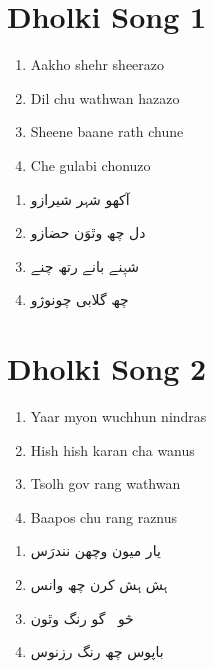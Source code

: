 \documentclass[12pt]{article}
\newcommand{\bigroman}[1]{\fontsize{16pt}{18pt}\selectfont\RaggedRight #1}
\newcommand{\bigarabic}[1]{\fontsize{16pt}{18pt}\selectfont\RaggedLeft \textarabic{#1}}
\begin{document}
\linenumbers

\section*{Dholki Song 1}

\begin{multicols}{2}

\begin{enumerate}[left=0pt,label=\arabic*.]
\item \bigroman{Aakho shehr sheerazo}
\item \bigroman{Dil chu wathwan hazazo}
\item \bigroman{Sheene baane rath chune}
\item \bigroman{Che gulabi chonuzo}
\end{enumerate}

\columnbreak

\begin{enumerate}[left=0pt,label=\arabic*.]
\item \bigarabic{آکھو شہر شیرازو}
\item \bigarabic{دل چھ وٿوَن حضازو}
\item \bigarabic{شیٖنے بانے رتھ چنے}
\item \bigarabic{چھ گلابی چونوژو}
\end{enumerate}

\end{multicols}

\vspace{1cm}

\section*{Dholki Song 2}

\begin{multicols}{2}

\begin{enumerate}[left=0pt,label=\arabic*.]
\item \bigroman{Yaar myon wuchhun nindras}
\item \bigroman{Hish hish karan cha wanus}
\item \bigroman{Tsolh gov rang wathwan}
\item \bigroman{Baapos chu rang raznus}
\end{enumerate}

\columnbreak

\begin{enumerate}[left=0pt,label=\arabic*.]
\item \bigarabic{یار میون وچھن نندرَس}
\item \bigarabic{ہش ہش کرن چھ وانس}
\item \bigarabic{څولٖہ گو رنگ وٿون}
\item \bigarabic{باپوس چھ رنگ رزنوس}
\end{enumerate}

\end{multicols}
\end{document}

